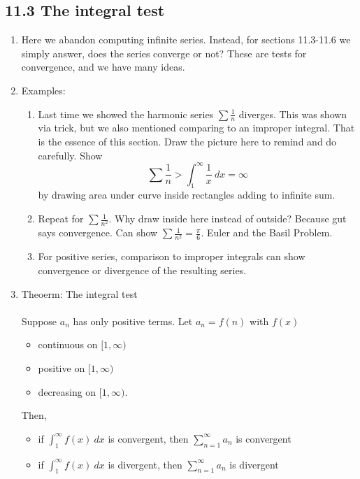 \documentclass{article}
\begin{document}
\subsection{11.3 The integral test}
\begin{enumerate}

\item Here we abandon computing infinite series. Instead, for sections 11.3-11.6 we simply answer, does the series converge or not? These are tests for convergence, and we have many ideas.

\item Examples:
\begin{enumerate}
\item Last time we showed the harmonic series $\sum \frac{1}{n}$ diverges. This was shown via trick, but we also mentioned comparing to an improper integral. That is the essence of this section. Draw the picture here to remind and do carefully. Show
\[
\sum \frac{1}{n} > \int_1^{\infty} \frac{1}{x}~dx = \infty
\]
by drawing area under curve inside rectangles adding to infinite sum.
\item Repeat for $\sum \frac{1}{n^2}$. Why draw inside here instead of outside? Because gut says convergence. Can show $\sum \frac{1}{n^2} = \frac{\pi}{6}$. Euler and the Basil Problem.
\item For positive series, comparison to improper integrals can show convergence or divergence of the resulting series.
\end{enumerate}

\item Theoerm: The integral test \\ \ \\
Suppose $a_n$ has only positive terms. Let $a_n = f(n)$ with $f(x)$
\begin{itemize}
\item continuous on $[1,\infty)$
\item positive on $[1,\infty)$
\item decreasing on $[1,\infty)$.
\end{itemize}
Then, 
\begin{itemize}
\item if $\int_1^\infty f(x)~dx$ is convergent, then $\sum_{n=1}^\infty a_n$ is convergent
\item if $\int_1^\infty f(x)~dx$ is divergent, then $\sum_{n=1}^\infty a_n$ is divergent
\end{itemize}


\end{enumerate}
\end{document}
